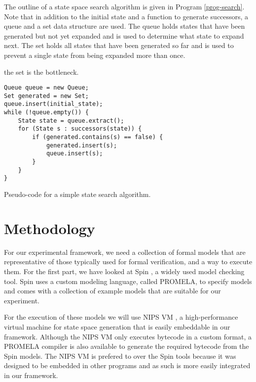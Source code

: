 \documentclass{acm_proc_article-sp}
\begin{document}
The outline of a state space search algorithm is given in Program
\ref{prog-search}. Note that in addition to the initial state and a function
to generate successors, a queue and a set data structure are used. The queue
holds states that have been generated but not yet expanded and is used to
determine what state to expand next. The set holds all states that have been
generated so far and is used to prevent a single state from being expanded
more than once.

the set is the bottleneck.

\begin{program}
\begin{verbatim}
Queue queue = new Queue;
Set generated = new Set;
queue.insert(initial_state);
while (!queue.empty()) {
    State state = queue.extract();
    for (State s : successors(state)) {
        if (generated.contains(s) == false) {
            generated.insert(s);
            queue.insert(s);
        }
    }
}
\end{verbatim}
\caption{Pseudo-code for a simple state search algorithm.}
\label{prog-search}
\end{program}



\section{Methodology}


For our experimental framework, we need a collection of formal models that are
representative of those typically used for formal verification, and a way to
execute them. For the first part, we have looked at Spin \cite{spin}, a widely
used model checking tool. Spin uses a custom modeling language, called
PROMELA, to specify models and comes with a collection of example models that
are suitable for our experiment.

For the execution of these models we will use NIPS VM \cite{weber2007evm}, a
high-performance virtual machine for state space generation that is easily
embeddable in our framework. Although the NIPS VM only executes bytecode in a
custom format, a PROMELA compiler is also available to generate the required
bytecode from the Spin models.\cite{nips} The NIPS VM is prefered to over the
Spin tools because it was designed to be embedded in other programs and as
such is more easily integrated in our framework.
\end{document}
